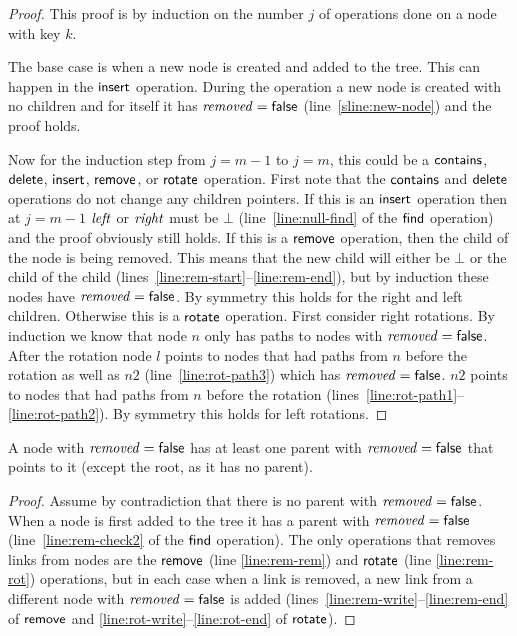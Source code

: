 \begin{proof}
This proof is by induction on the number $j$ of operations done on a node with key $k$.

The base case is when a new node is created and added to the tree.
This can happen in the $\act{insert}$ operation.
During the operation a new node is created with no children and for itself it has $\ms{removed}=\lit{false}$ (line~\ref{sline:new-node}) and the proof holds.

Now for the induction step from $j=m-1$ to $j=m$, this could be a $\act{contains}$, $\act{delete}$, $\act{insert}$, $\act{remove}$, or $\act{rotate}$ operation.
First note that the $\act{contains}$ and $\act{delete}$ operations do not change any children pointers.
If this is an $\act{insert}$ operation then at $j=m-1$ $\ms{left}$ or $\ms{right}$ must be $\bot$ (line~\ref{line:null-find} of the $\act{find}$ operation) and the proof obviously still holds.
If this is a $\act{remove}$ operation, then the child of the node is being removed.
This means that the new child will either be $\bot$ or the child of the child (lines~\ref{line:rem-start}--\ref{line:rem-end}), 
but by induction these nodes have $\ms{removed}=\lit{false}$.
By symmetry this holds for the right and left children.
Otherwise this is a $\act{rotate}$ operation.
First consider right rotations.
By induction we know that node $n$ only has paths to nodes with $\ms{removed}=\lit{false}$.
After the rotation node $l$ points to nodes that had paths from $n$ before the rotation as well as $n2$ (line~\ref{line:rot-path3}) which has $\ms{removed}=\lit{false}$.
$n2$ points to nodes that had paths from $n$ before the rotation (lines~\ref{line:rot-path1}--\ref{line:rot-path2}).
By symmetry this holds for left rotations.
\end{proof}


\begin{lemma}
\label{lemma:false-rem-par}
A node with $\ms{removed}=\lit{false}$ has at least one parent with $\ms{removed}=\lit{false}$ that points to it (except the root, as it has no parent).
\end{lemma}
\begin{proof}
Assume by contradiction that there is no parent with $\ms{removed}=\lit{false}$.
When a node is first added to the tree it has a parent with $\ms{removed}=\lit{false}$ (line~\ref{line:rem-check2} of the $\act{find}$ operation).
The only operations that removes links from nodes are the $\act{remove}$ (line \ref{line:rem-rem}) and $\act{rotate}$ (line \ref{line:rem-rot}) operations,
but in each case when a link is removed, a new link from a different node with $\ms{removed}=\lit{false}$ is added
(lines~\ref{line:rem-write}--\ref{line:rem-end} of $\act{remove}$ and \ref{line:rot-write}--\ref{line:rot-end} of $\act{rotate}$).
\end{proof}



